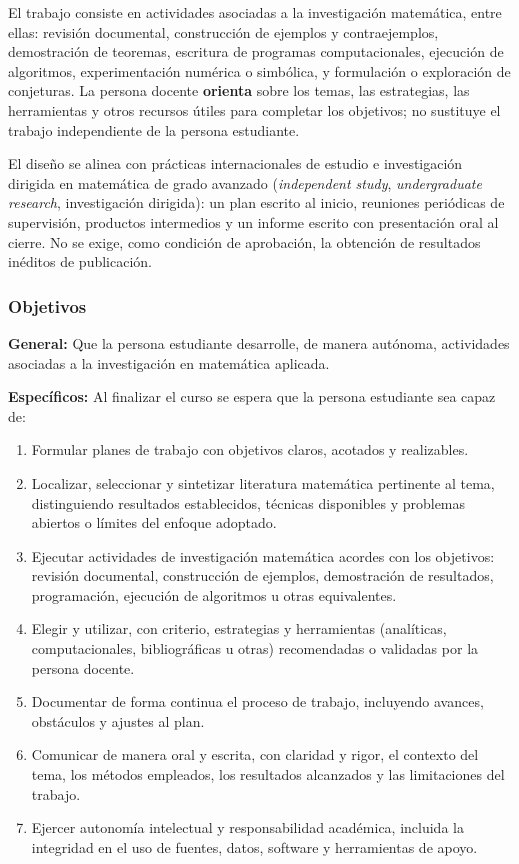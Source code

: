 \begin{refsection}
El trabajo consiste en actividades asociadas a la investigación matemática, entre ellas: revisión documental, construcción de ejemplos y contraejemplos, demostración de teoremas, escritura de programas computacionales, ejecución de algoritmos, experimentación numérica o simbólica, y formulación o exploración de conjeturas. La persona docente \textbf{orienta} sobre los temas, las estrategias, las herramientas y otros recursos útiles para completar los objetivos; no sustituye el trabajo independiente de la persona estudiante.

El diseño se alinea con prácticas internacionales de estudio e investigación dirigida en matemática de grado avanzado (\emph{independent study}, \emph{undergraduate research}, investigación dirigida): un plan escrito al inicio, reuniones periódicas de supervisión, productos intermedios y un informe escrito con presentación oral al cierre. No se exige, como condición de aprobación, la obtención de resultados inéditos de publicación.

\subsubsection*{Objetivos}

\textbf{General:} Que la persona estudiante desarrolle, de manera autónoma, actividades asociadas a la investigación en matemática aplicada.

\textbf{Específicos:} Al finalizar el curso se espera que la persona estudiante sea capaz de:

\begin{enumerate}
\item Formular planes de trabajo con objetivos claros, acotados y realizables.
\item Localizar, seleccionar y sintetizar literatura matemática pertinente al tema, distinguiendo resultados establecidos, técnicas disponibles y problemas abiertos o límites del enfoque adoptado.
\item Ejecutar actividades de investigación matemática acordes con los objetivos: revisión documental, construcción de ejemplos, demostración de resultados, programación, ejecución de algoritmos u otras equivalentes.
\item Elegir y utilizar, con criterio, estrategias y herramientas (analíticas, computacionales, bibliográficas u otras) recomendadas o validadas por la persona docente.
\item Documentar de forma continua el proceso de trabajo, incluyendo avances, obstáculos y ajustes al plan.
\item Comunicar de manera oral y escrita, con claridad y rigor, el contexto del tema, los métodos empleados, los resultados alcanzados y las limitaciones del trabajo.
\item Ejercer autonomía intelectual y responsabilidad académica, incluida la integridad en el uso de fuentes, datos, software y herramientas de apoyo.
\end{enumerate}


\end{refsection}

